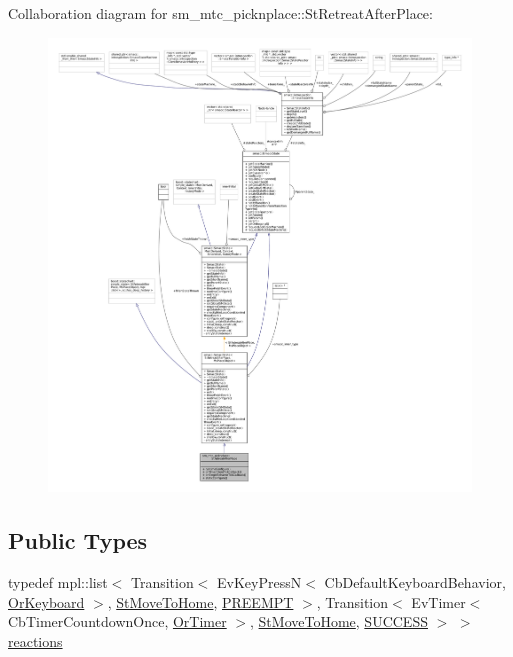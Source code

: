 Collaboration diagram for sm\+\_\+mtc\+\_\+picknplace\+:\+:St\+Retreat\+After\+Place\+:
\nopagebreak
\begin{figure}[H]
\begin{center}
\leavevmode
\includegraphics[width=350pt]{structsm__mtc__picknplace_1_1StRetreatAfterPlace__coll__graph}
\end{center}
\end{figure}
\subsection*{Public Types}
\begin{DoxyCompactItemize}
\item 
typedef mpl\+::list$<$ Transition$<$ Ev\+Key\+PressN$<$ Cb\+Default\+Keyboard\+Behavior, \hyperlink{classsm__mtc__picknplace_1_1OrKeyboard}{Or\+Keyboard} $>$, \hyperlink{structsm__mtc__picknplace_1_1StMoveToHome}{St\+Move\+To\+Home}, \hyperlink{classPREEMPT}{P\+R\+E\+E\+M\+PT} $>$, Transition$<$ Ev\+Timer$<$ Cb\+Timer\+Countdown\+Once, \hyperlink{classsm__mtc__picknplace_1_1OrTimer}{Or\+Timer} $>$, \hyperlink{structsm__mtc__picknplace_1_1StMoveToHome}{St\+Move\+To\+Home}, \hyperlink{classSUCCESS}{S\+U\+C\+C\+E\+SS} $>$ $>$ \hyperlink{structsm__mtc__picknplace_1_1StRetreatAfterPlace_a6a36b90d92506b41620870398c65a2cc}{reactions}
\end{DoxyCompactItemize}
